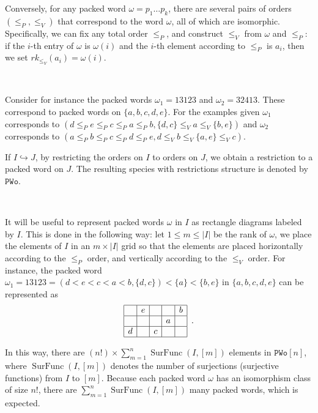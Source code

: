 \documentclass[12pt, reqno]{amsart}
\theoremstyle{definition}
\DeclareMathOperator{\sFunc}{\mathrm{SurFunc}}
\begin{document}
Conversely, for any packed word $\omega = p_1\dots p_k$, there are several pairs of orders $(\leq_P, \leq_V)$ that correspond to the word $\omega $, all of which are isomorphic.
Specifically, we can fix any total order $\leq_P$, and construct $\leq_V$ from $\omega $ and $\leq_P$: if the $i$-th entry of $\omega$ is $\omega(i)$ and the $i$-th element according to $\leq_P$ is $a_i$, then we set $rk_{\leq_V}(a_i) = \omega(i)$.

\

Consider for instance the packed words $\omega_1 = 13123$ and $\omega_2 = 32413$.
These correspond to packed words on $\{a, b, c, d, e\}$.
For the examples given $\omega_1$ corresponds to $(d \leq_P e \leq_P c \leq_P a \leq_P b, \{d, c\} \leq_V a \leq_V \{b, e\} )$ and $\omega_2$ corresponds to $(a \leq_P b \leq_P c \leq_P d \leq_P e, d \leq_V b \leq_V \{a, e\} \leq_V c )$.


If $I \hookrightarrow J$, by restricting the orders on $I$ to orders on $J$, we obtain a restriction to a packed word on $J$.
The resulting species with restrictions structure is denoted by $\mathtt{PWo}$.

\

It will be useful to represent packed words $\omega $ in $I$ as rectangle diagrams labeled by $I$.
This is done in the following way: let $1\leq m \leq |I|$ be the rank of $\omega$, we place the elements of $I$ in an $m \times |I|$ grid so that the elements are placed horizontally according to the $\leq_P$ order, and vertically according to the $\leq_V$ order.
For instance, the packed word $\omega_1 = 13123 = ( d < e < c < a < b, \{d, c\}) < \{a\} < \{b, e\}$ in $\{a, b, c, d, e\}$ can be represented as 
\begin{equation}
\begin{array}{|c|c|c|c|c|}
	\hline   & e &   &   & b \\
    \hline   &   &   & a &   \\
    \hline d &   & c &   &   \\
    \hline 
\end{array}\, \, \, .
\end{equation}




In this way, there are $(n!) \times \sum_{m = 1}^n \sFunc(I, [m])$ elements in $\mathtt{PWo}[n]$, where $\sFunc(I, [m])$ denotes the number of surjections (surjective functions) from $I$ to $[m]$.
Because each packed word $\omega $ has an isomorphism class of size $n!$, there are $ \sum_{m = 1}^n \sFunc(I, [m])$ many packed words, which is expected.
\end{document}
